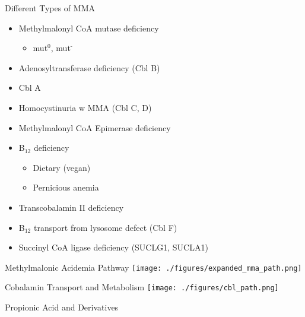 \documentclass[presentation, smaller]{beamer}
\begin{document}
\begin{frame}[label={sec:orgheadline3}]{Different Types of MMA}
\begin{itemize}
\item Methylmalonyl CoA mutase deficiency
\begin{itemize}
\item mut\(^{\text{0}}\), mut\(^{\text{-}}\)
\end{itemize}
\item Adenosyltransferase deficiency (Cbl B)
\item Cbl A
\item Homocystinuria w MMA (Cbl C, D)
\item Methylmalonyl CoA Epimerase deficiency
\item B\(_{\text{12}}\) deficiency
\begin{itemize}
\item Dietary (vegan)
\item Pernicious anemia
\end{itemize}
\item Transcobalamin II deficiency
\item B\(_{\text{12}}\) transport from lysosome defect (Cbl F)
\item Succinyl CoA ligase deficiency (SUCLG1, SUCLA1)
\end{itemize}
\end{frame}

\begin{frame}[label={sec:orgheadline4}]{Methylmalonic  Acidemia Pathway}
\centering
\texttt{[image: ./figures/expanded\_mma\_path.png]}
\end{frame}


\begin{frame}[label={sec:orgheadline5}]{Cobalamin Transport and Metabolism}
\texttt{[image: ./figures/cbl\_path.png]}
\end{frame}

\begin{frame}[label={sec:orgheadline6}]{Propionic Acid and Derivatives}
\centering

\vspace{2em}
\hspace{4em}

\vspace{2em}
\hspace{4em}
\end{frame}
\end{document}
